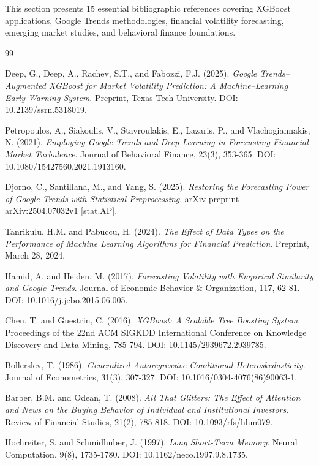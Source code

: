 \documentclass[12pt,a4paper]{article}
\begin{document}
This section presents 15 essential bibliographic references covering XGBoost applications, Google Trends methodologies, financial volatility forecasting, emerging market studies, and behavioral finance foundations.


\begin{thebibliography}{99}

Deep, G., Deep, A., Rachev, S.T., and Fabozzi, F.J. (2025).
\textit{Google Trends–Augmented XGBoost for Market Volatility Prediction: A Machine–Learning Early-Warning System}.
Preprint, Texas Tech University.
DOI: 10.2139/ssrn.5318019.

Petropoulos, A., Siakoulis, V., Stavroulakis, E., Lazaris, P., and Vlachogiannakis, N. (2021).
\textit{Employing Google Trends and Deep Learning in Forecasting Financial Market Turbulence}.
Journal of Behavioral Finance, 23(3), 353-365.
DOI: 10.1080/15427560.2021.1913160.

Djorno, C., Santillana, M., and Yang, S. (2025).
\textit{Restoring the Forecasting Power of Google Trends with Statistical Preprocessing}.
arXiv preprint arXiv:2504.07032v1 [stat.AP].

Tanrikulu, H.M. and Pabuccu, H. (2024).
\textit{The Effect of Data Types on the Performance of Machine Learning Algorithms for Financial Prediction}.
Preprint, March 28, 2024.

Hamid, A. and Heiden, M. (2017).
\textit{Forecasting Volatility with Empirical Similarity and Google Trends}.
Journal of Economic Behavior \& Organization, 117, 62-81.
DOI: 10.1016/j.jebo.2015.06.005.

Chen, T. and Guestrin, C. (2016).
\textit{XGBoost: A Scalable Tree Boosting System}.
Proceedings of the 22nd ACM SIGKDD International Conference on Knowledge Discovery and Data Mining, 785-794.
DOI: 10.1145/2939672.2939785.

Bollerslev, T. (1986).
\textit{Generalized Autoregressive Conditional Heteroskedasticity}.
Journal of Econometrics, 31(3), 307-327.
DOI: 10.1016/0304-4076(86)90063-1.

Barber, B.M. and Odean, T. (2008).
\textit{All That Glitters: The Effect of Attention and News on the Buying Behavior of Individual and Institutional Investors}.
Review of Financial Studies, 21(2), 785-818.
DOI: 10.1093/rfs/hhm079.

Hochreiter, S. and Schmidhuber, J. (1997).
\textit{Long Short-Term Memory}.
Neural Computation, 9(8), 1735-1780.
DOI: 10.1162/neco.1997.9.8.1735.


\end{thebibliography}
\end{document}
